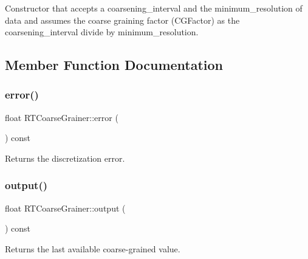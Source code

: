 Constructor that accepts a {\ttfamily coarsening\+\_\+interval} and the {\ttfamily minimum\+\_\+resolution} of data and assumes the coarse graining factor ({\ttfamily C\+G\+Factor}) as the {\ttfamily coarsening\+\_\+interval} divide by {\ttfamily minimum\+\_\+resolution}. 



\subsection{Member Function Documentation}
\mbox{\label{classRTCoarseGrainer_a0a2a0cf51154b2ed00d18e397e0e0c95}} 
\subsubsection{\texorpdfstring{error()}{error()}}
{\footnotesize\ttfamily float R\+T\+Coarse\+Grainer\+::error (\begin{DoxyParamCaption}{ }\end{DoxyParamCaption}) const\hspace{0.3cm}{\ttfamily [inline]}}



Returns the discretization error. 

\mbox{\label{classRTCoarseGrainer_a2d0cd547401422150d1293a156abc86e}} 
\subsubsection{\texorpdfstring{output()}{output()}}
{\footnotesize\ttfamily float R\+T\+Coarse\+Grainer\+::output (\begin{DoxyParamCaption}{ }\end{DoxyParamCaption}) const\hspace{0.3cm}{\ttfamily [inline]}}



Returns the last available coarse-\/grained value. 

\mbox{\label{classRTCoarseGrainer_a92ba58efd22b7c3c9e79cd4d5e065e70}} 
